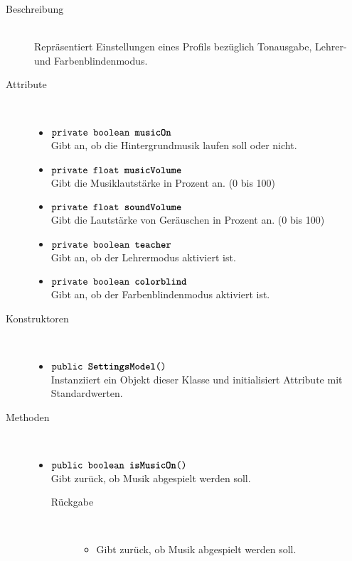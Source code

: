 \begin{description}
\item[Beschreibung] \hfill \\ Repräsentiert Einstellungen eines Profils bezüglich Tonausgabe, Lehrer- und Farbenblindenmodus.

\item[Attribute] \hfill \\
	\vspace{-.8cm}
	\begin{itemize}
		\item $\texttt{private boolean \textbf{musicOn}}$ \\ Gibt an, ob die Hintergrundmusik laufen soll oder nicht.
		\item $\texttt{private float \textbf{musicVolume}}$ \\ Gibt die Musiklautstärke in Prozent an. (0 bis 100)
		\item $\texttt{private float \textbf{soundVolume}}$ \\ Gibt die Lautstärke von Geräuschen in Prozent an. (0 bis 100)
		\item $\texttt{private boolean \textbf{teacher}}$ \\ Gibt an, ob der Lehrermodus aktiviert ist.
		\item $\texttt{private boolean \textbf{colorblind}}$ \\ Gibt an, ob der Farbenblindenmodus aktiviert ist.
	\end{itemize}
	
\item[Konstruktoren] \hfill \\
	\vspace{-.8cm}
	\begin{itemize}
		\item $\texttt{public \textbf{SettingsModel}()}$ \\ Instanziiert ein Objekt dieser Klasse und initialisiert Attribute mit Standardwerten.
	\end{itemize}
	
\item[Methoden] \hfill \\
	\vspace{-.8cm}
	\begin{itemize}
		\item $\texttt{public boolean \textbf{isMusicOn}()}$ \\ Gibt zurück, ob Musik abgespielt werden soll.
		\begin{description}
			\item[Rückgabe] \hfill \\
			\vspace{-.8cm}
			\begin{itemize}
				\item Gibt zurück, ob Musik abgespielt werden soll.
			\end{itemize}
		\end{description}
		

\end{itemize}
\end{description}
